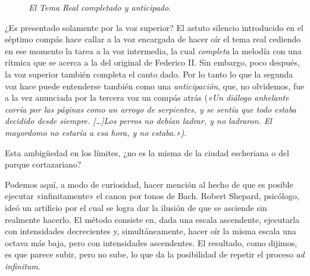 \begin{figure}[H]
\begin{center}
\end{center}
\caption{\emph{El Tema Real completado y anticipado.}}
\label{ceb:completado}
\end{figure}

¿Es presentado solamente por la voz superior? El astuto silencio introducido en el séptimo compás hace callar a la voz encargada de hacer oír el tema real cediendo en ese momento la tarea a la voz intermedia, la cual \emph{completa} la melodía con una rítmica que se acerca a la del original de Federico II. Sin embargo, poco después, la voz superior también completa el canto dado. Por lo tanto lo que la segunda voz hace puede entenderse también como una \emph{anticipación}, que, no olvidemos, fue a la vez anunciada por la tercera voz un compás atrás (\emph{«Un diálogo anhelante corría por las páginas como un arroyo de serpientes, y se sentía que \emph{todo estaba decidido desde siempre}. [\ldots]Los perros no debían ladrar, y no ladraron. El mayordomo no estaría a esa hora, y no estaba.»)}.

Esta ambigüedad en los límites, ¿no es la misma de la ciudad escheriana o del parque cortazariano?

Podemos aquí, a modo de curiosidad, hacer mención al hecho de que es posible ejecutar «infinitamente» el canon por tonos de Bach. Robert Shepard, psicólogo, ideó un artificio por el cual se logra dar la ilusión de que se asciende sin realmente hacerlo. El método consiste en, dada una escala ascendente, ejecutarla con intensidades decrecientes y, simultáneamente, hacer oír la misma escala una octava más baja, pero con intensidades ascendentes. El resultado, como dijimos, es que parece subir, pero no sube, lo que da la posibilidad de repetir el proceso \emph{ad infinitum}.

